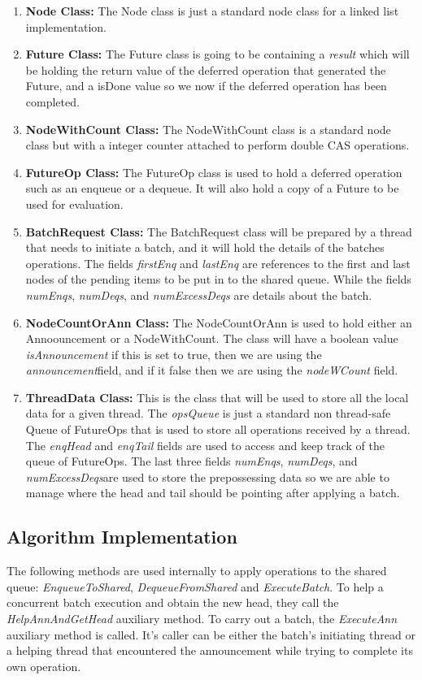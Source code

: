 \begin{enumerate}
 \item \textbf{Node Class: } The Node class is just a standard node class for a linked list implementation.
  \item \textbf{Future Class: }The Future class is going to be containing a \textit{result} which will be holding the return value of the deferred operation that generated the Future, and a isDone value so we now if the deferred operation has been completed.
  \item \textbf{NodeWithCount Class: } The NodeWithCount class is a standard node class but with a integer counter attached to perform double CAS operations.
  \item \textbf{FutureOp Class: }The FutureOp class is used to hold a deferred operation such as an enqueue or a dequeue. It will also hold a copy of a Future to be used for evaluation.
  \item \textbf{BatchRequest Class: } The BatchRequest class will be prepared by a thread that needs to initiate a batch, and it will hold the details of the batches operations. The fields \textit{firstEnq} and \textit{lastEnq} are references to the first and last nodes of the pending items to be put in to the shared queue. While the fields  \textit{numEnqs}, \textit{numDeqs}, and \textit{numExcessDeqs} are details about the batch.
  \item \textbf{NodeCountOrAnn Class: }The NodeCountOrAnn is used to hold either an Annoouncement or a NodeWithCount. The class will have a boolean value \textit{isAnnouncement} if this is set to true, then we are using the \textit{announcement}field, and if it false then we are using the \textit{nodeWCount} field. 
  \item \textbf{ThreadData Class: } This is the class that will be used to store all the local data for a given thread. The \textit{opsQueue} is just a standard non thread-safe Queue of FutureOps that is used to store all operations received by a thread. The \textit{enqHead} and \textit{enqTail} fields are used to access and keep track of the queue of FutureOps. The last three fields \textit{numEnqs}, \textit{numDeqs}, and \textit{numExcessDeqs}are used to store the prepossessing data so we are able to manage where the head and tail should be pointing after applying a batch. 
\end{enumerate}
\newpage


\subsection{Algorithm Implementation}
The following methods are used internally to apply operations to the shared queue: \textit{EnqueueToShared}, \textit{DequeueFromShared} and \textit{ExecuteBatch}. To help a concurrent batch execution and obtain the new head, they call the \textit{HelpAnnAndGetHead} auxiliary method. To carry out a batch, the \textit{ExecuteAnn} auxiliary method is called. It’s caller can be either the batch’s initiating thread or a helping thread that encountered the announcement while trying to complete its own operation.\newline

